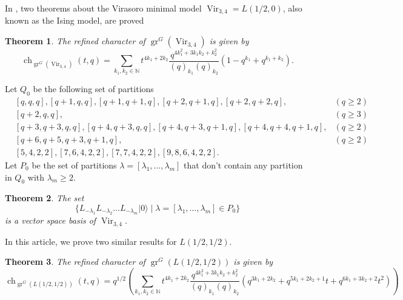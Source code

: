 \documentclass[12pt, a4paper]{article}
\newtheorem{theorem}{Theorem}[section]
\theoremstyle{remark}
\DeclareMathOperator{\Vir}{Vir}
\DeclareMathOperator{\gr}{gr}
\DeclareMathOperator{\ch}{ch}
\newcommand{\vac}{|0\rangle}
\begin{document}
In \cite{andrews_singular_2022}, two theorems about the Virasoro minimal model $\Vir_{3, 4} = L(1/2, 0)$, also known as the Ising model, are proved

\begin{theorem}
  \label{thr:1}
  The refined character of $\gr^G(\Vir_{3,4})$ is given by
  \begin{equation*}
    \ch_{\gr^G(\Vir_{3, 4})}(t, q) = \sum_{k_1, k_2\in \mathbb{N}}t^{4k_1 + 2k_2}\frac{q^{4k_1^2 + 3k_1k_2 + k_2^2}}{(q)_{k_1}(q)_{k_2}}(1 - q^{k_1} + q^{k_1 + k_2}).
  \end{equation*}
\end{theorem}

Let $Q_0$ be the following set of partitions
\begin{align*}
  &[q, q, q], [q + 1, q, q], [q + 1, q + 1, q], [q + 2, q + 1, q], [q + 2, q + 2, q], &(q \ge 2) \\
  &[q + 2, q, q], &(q \ge 3) \\
  &[q + 3, q + 3, q, q], [q + 4, q + 3, q, q],  [q + 4, q + 3, q + 1, q], [q + 4, q + 4, q + 1, q], &(q \ge 2) \\
  &[q + 6, q + 5, q + 3, q + 1, q], &(q \ge 2) \\
  &[5, 4, 2, 2], [7, 6, 4, 2, 2], [7, 7, 4, 2, 2], [9, 8, 6, 4, 2, 2].
\end{align*}
Let $P_0$ be the set of partitions $\lambda = [\lambda_1, \dots, \lambda_m]$ that don't contain any partition in $Q_0$ with $\lambda_m \ge 2$.

\begin{theorem}
  \label{thr:2}
  The set
  \begin{equation*}
    \{L_{-\lambda_1}L_{-\lambda_2}\dots L_{-\lambda_m}\vac \mid \lambda = [\lambda_1, \dots, \lambda_m] \in P_0\}
  \end{equation*}
  is a vector space basis of $\Vir_{3, 4}$.
\end{theorem}

In this article, we prove two similar results for $L(1/2,1/2)$.

\begin{theorem}
  \label{thr:3}
  The refined character of $\gr^G(L(1/2, 1/2))$ is given by
  \begin{equation*}
    \ch_{\gr^G(L(1/2, 1/2))}(t, q) = q^{1/2}\left( \sum_{k_1, k_2 \in \mathbb{N}}t^{4k_1 + 2k_2}\frac{q^{4k_1^2 + 3k_1k_2 + k_2^2}}{(q)_{k_1}(q)_{k_2}}(q^{3k_1 + 2k_2} + q^{5k_1 + 2k_2 + 1}t + q^{6k_1 + 3k_2 + 2}t^2) \right)
  \end{equation*}
\end{theorem}
\end{document}
